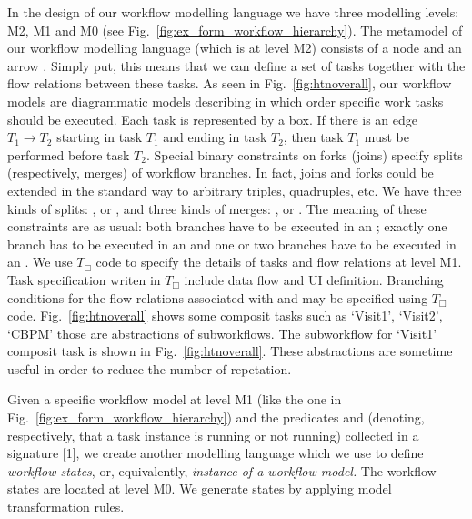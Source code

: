 \documentclass[a4paper]{llncs}
\begin{document}
In the design of our workflow modelling language we have three modelling levels: M2, M1 and M0 (see Fig.~\ref{fig:ex_form_workflow_hierarchy}). 
The metamodel of our workflow modelling language (which is at level M2) consists of a node  and an arrow . 
Simply put, this means that we can define a set of tasks together with the flow relations between these tasks. 
As seen in Fig.~\ref{fig:htnoverall}, our workflow models are diagrammatic models describing in which order specific work tasks should be executed. 
Each task is represented by a box. 
If there is an edge $T_1 \rightarrow T_2$ starting in task $T_1$ and ending in task $T_2$, then task $T_1$ must be performed before task $T_2$. 
Special binary constraints on forks (joins) specify splits (respectively, merges) of workflow branches. 
In fact, joins and forks could be extended in the standard way to arbitrary triples, quadruples, etc.
We have three kinds of splits: , \textpred{[or\_split]} or , and three kinds of merges: ,  
or \textpred{[or\_merge]}. 
The meaning of these constraints are as usual: both branches have to be executed in an ; exactly one branch has to be executed in an  
and one or two branches have to be executed in an \textpred{[or\_split]}. 
We use $T_\Box$ code to specify the details of tasks and flow relations at level M1. 
Task specification writen in $T_ \Box$ include data flow and UI definition. 
Branching conditions for the flow relations associated with \textpred{[or\_split]} and  may be specified using $T_\Box$ code. 
Fig.~\ref{fig:htnoverall} shows some composit tasks such as `Visit1', `Visit2', `CBPM' those are abstractions of subworkflows. 
The subworkflow for `Visit1' composit task is shown in Fig.~\ref{fig:htnoverall}. 
These abstractions are sometime useful in order to reduce the number of repetation. 




Given a specific workflow model at level M1 (like the one in Fig.~\ref{fig:ex_form_workflow_hierarchy}) and the predicates \textpred{[running]} and   
(denoting, respectively, that a task instance is running or not running) collected in a signature \sig{\Sigma}[1], we create another modelling language which we use to define \emph{workflow states}, 
or, equivalently, \emph{instance of a workflow model.} 
The workflow states are located at level M0. We generate states by applying model transformation rules. 
\end{document}
